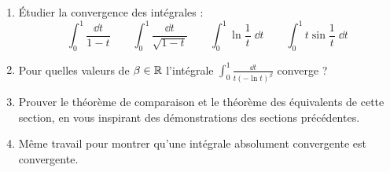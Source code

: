 \begin{frame}
\begin{miniexercice}
	\begin{enumerate}
  \item \'Etudier la convergence des intégrales :
  $$\int_0^1 \frac{\dd t}{1-t} \qquad 
  \int_0^1 \frac{\dd t}{\sqrt{1-t}} \qquad 
  \int_0^1 \ln \frac1t \;\dd t \qquad
  \int_0^1 t\sin \frac1t \;\dd t$$
  
  \item Pour quelles valeurs de $\beta \in \mathbb{R}$ l'intégrale
  $\int_0^1 \frac{\dd t}{t(-\ln t)^\beta}$ converge ?
  
  \item Prouver le théorème de comparaison et le théorème des équivalents de cette section, 
  en vous inspirant des démonstrations des sections précédentes.
 
  \item Même travail pour montrer qu'une intégrale absolument convergente est convergente.

\end{enumerate}

\end{miniexercice}	
\end{frame}






